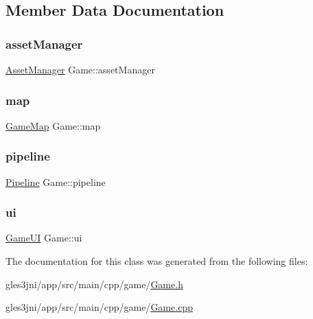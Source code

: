 \subsection{Member Data Documentation}
\mbox{\label{class_game_a4617966fb0ab4c35025e2b1b3c262e9e}} 
\subsubsection{\texorpdfstring{asset\+Manager}{assetManager}}
{\footnotesize\ttfamily \hyperlink{class_asset_manager}{Asset\+Manager} Game\+::asset\+Manager\hspace{0.3cm}{\ttfamily [private]}}

\mbox{\label{class_game_a45be81aaf550d2abb9ac4ba9a59d1036}} 
\subsubsection{\texorpdfstring{map}{map}}
{\footnotesize\ttfamily \hyperlink{class_game_map}{Game\+Map} Game\+::map\hspace{0.3cm}{\ttfamily [private]}}

\mbox{\label{class_game_a892521e52fc199340f33db5688d199b1}} 
\subsubsection{\texorpdfstring{pipeline}{pipeline}}
{\footnotesize\ttfamily \hyperlink{class_pipeline}{Pipeline} Game\+::pipeline\hspace{0.3cm}{\ttfamily [private]}}

\mbox{\label{class_game_a9c0a69f74dfc66b9af81efbce5e38e22}} 
\subsubsection{\texorpdfstring{ui}{ui}}
{\footnotesize\ttfamily \hyperlink{class_game_u_i}{Game\+UI} Game\+::ui\hspace{0.3cm}{\ttfamily [private]}}



The documentation for this class was generated from the following files\+:\begin{DoxyCompactItemize}
\item 
gles3jni/app/src/main/cpp/game/\hyperlink{_game_8h}{Game.\+h}\item 
gles3jni/app/src/main/cpp/game/\hyperlink{_game_8cpp}{Game.\+cpp}\end{DoxyCompactItemize}
